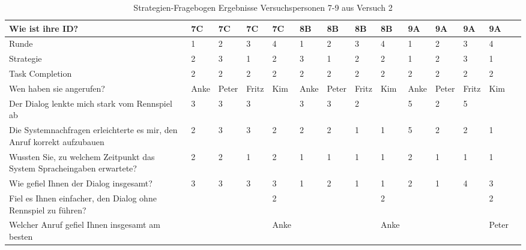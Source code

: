 \documentclass[12pt,a4paper]{scrartcl}
\begin{document}
\begin{appendix}
\begin{table}
\caption{Strategien-Fragebogen Ergebnisse Versuchspersonen 7-9 aus Versuch 2}
\begin{tabular}{|p{6cm}| p{0.8cm} | p{0.8cm} | p{0.8cm} | p{0.8cm} || p{0.8cm} | p{0.8cm} | p{0.8cm} | p{0.8cm} || p{0.8cm} | p{0.8cm} | p{0.8cm} | p{0.8cm} | p{} | }
\hline
	Wie ist ihre ID? & 7C & 7C & 7C & 7C & 8B & 8B & 8B & 8B & 9A & 9A & 9A & 9A \\ \hline \hline
	Runde & 1 & 2 & 3 & 4 & 1 & 2 & 3 & 4 & 1 & 2 & 3 & 4 \\ \hline
	Strategie & 2 & 3 & 1 & 2 & 3 & 1 & 2 & 2 & 1 & 2 & 3 & 1 \\ \hline \hline
	Task Completion & 2 & 2 & 2 & 2 & 2 & 2 & 2 & 2 & 2 & 2 & 2 & 2 \\ \hline \hline
	Wen haben sie angerufen? & Anke & Peter & Fritz & Kim & Anke & Peter & Fritz & Kim & Anke & Peter & Fritz & Kim \\ \hline
	Der Dialog lenkte mich stark vom Rennspiel ab & 3 & 3 & 3 &  & 3 & 3 & 2 &  & 5 & 2 & 5 &  \\ \hline
	Die Systemnachfragen erleichterte es mir, den Anruf korrekt aufzubauen & 2 & 3 & 3 & 2 & 2 & 2 & 1 & 1 & 5 & 2 & 2 & 1 \\ \hline
	Wussten Sie, zu welchem Zeitpunkt das System Spracheingaben erwartete? & 2 & 2 & 1 & 2 & 1 & 1 & 1 & 1 & 2 & 1 & 1 & 1 \\ \hline
	Wie gefiel Ihnen der Dialog insgesamt? & 3 & 3 & 3 & 3 & 1 & 2 & 1 & 1 & 2 & 1 & 4 & 3 \\ \hline
	Fiel es Ihnen einfacher, den Dialog ohne Rennspiel zu führen? &  &  &  & 2 &  &  &  & 2 &  &  &  & 2 \\ \hline
	Welcher Anruf gefiel Ihnen insgesamt am besten &  &  &  & Anke &  &  &  & Anke &  &  &  & Peter  \\ \hline
\end{tabular}
\end{table}


\end{appendix}
\end{document}
